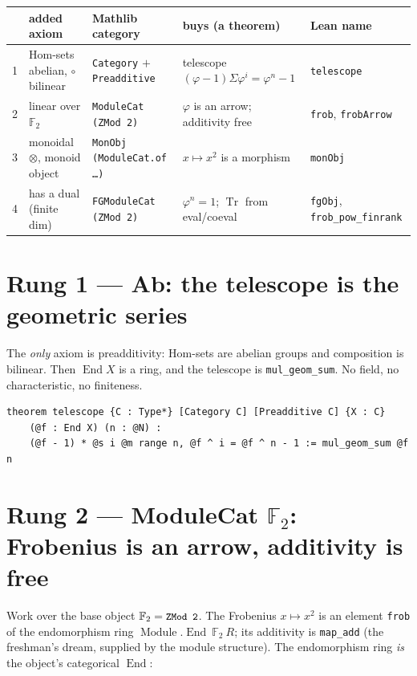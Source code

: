 \documentclass[11pt]{article}
\newcommand{\lc}[1]{\texttt{\small #1}}
\newcommand{\Tr}{\operatorname{Tr}}
\newcommand{\Ff}{\mathbb{F}_2}
\newcommand{\End}{\operatorname{End}}
\newcommand{\Module}{\operatorname{Module}}
\begin{document}
\begin{center}\small
\renewcommand{\arraystretch}{1.35}
\begin{tabular}{@{}p{0.7cm}p{3.0cm}p{3.5cm}p{4.0cm}p{3.4cm}@{}}
\hline
& \textbf{added axiom} & \textbf{Mathlib category} & \textbf{buys (a theorem)} & \textbf{Lean name}\\
\hline
\textcolor{r1}{1} & Hom-sets abelian, $\circ$ bilinear & \lc{Category} $+$ \lc{Preadditive} & telescope $(\varphi{-}1)\Sigma\varphi^{i}=\varphi^{n}{-}1$ & \lc{telescope}\\
\textcolor{r2}{2} & linear over $\Ff$ & \lc{ModuleCat (ZMod 2)} & $\varphi$ is an arrow; additivity free & \lc{frob}, \lc{frobArrow}\\
\textcolor{r3}{3} & monoidal $\otimes$, monoid object & \lc{MonObj (ModuleCat.of \dots)} & $x\mapsto x^{2}$ is a morphism & \lc{monObj}\\
\textcolor{r4}{4} & has a dual (finite dim) & \lc{FGModuleCat (ZMod 2)} & $\varphi^{n}=1$; $\Tr$ from eval/coeval & \lc{fgObj}, \lc{frob\_pow\_finrank}\\
\hline
\end{tabular}
\end{center}

\section{Rung 1 --- Ab: the telescope is the geometric series}

The \emph{only} axiom is preadditivity: Hom-sets are abelian groups and composition
is bilinear. Then $\End X$ is a ring, and the telescope is \lc{mul\_geom\_sum}. No
field, no characteristic, no finiteness.

\begin{lstlisting}
theorem telescope {C : Type*} [Category C] [Preadditive C] {X : C}
    (@f : End X) (n : @N) :
    (@f - 1) * @s i @m range n, @f ^ i = @f ^ n - 1 := mul_geom_sum @f n
\end{lstlisting}

\section{Rung 2 --- ModuleCat $\Ff$: Frobenius is an arrow, additivity is free}

Work over the base object $\Ff=\lc{ZMod 2}$. The Frobenius $x\mapsto x^{2}$ is an
element \lc{frob} of the endomorphism ring $\Module.\End\ \Ff\ R$; its additivity is
\lc{map\_add} (the freshman's dream, supplied by the module structure). The
endomorphism ring \emph{is} the object's categorical $\End$:
\end{document}
